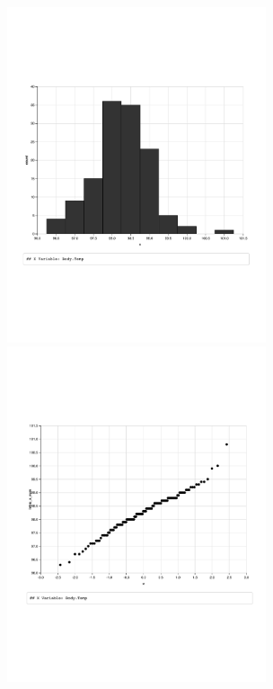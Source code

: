 \documentclass{article}
\begin{document}
\begin{enumerate}
\centerline{\includegraphics[width=3in]{hmwkch5-histogram.pdf}\includegraphics[width=3in]{hmwkch5-normprob.pdf}}


\end{enumerate}
\end{document}
